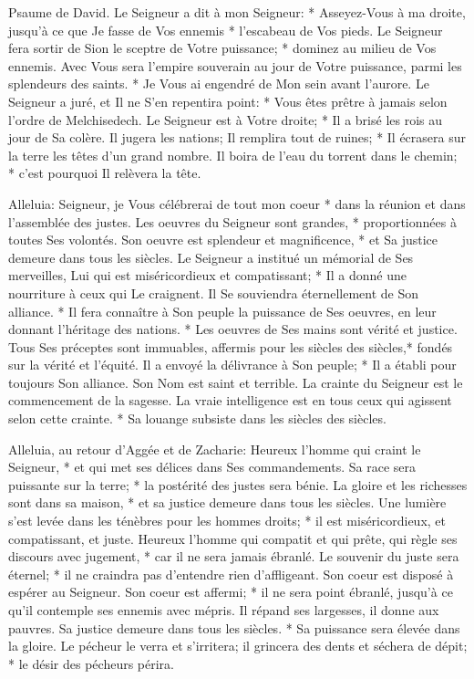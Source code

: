 Psaume de David. Le Seigneur a dit à mon Seigneur: * Asseyez-Vous à ma droite, jusqu'à ce que Je fasse de Vos ennemis * l'escabeau de Vos pieds.
Le Seigneur fera sortir de Sion le sceptre de Votre puissance; * dominez au milieu de Vos ennemis.
Avec Vous sera l'empire souverain au jour de Votre puissance, parmi les splendeurs des saints. * Je Vous ai engendré de Mon sein avant l'aurore.
Le Seigneur a juré, et Il ne S'en repentira point: * Vous êtes prêtre à jamais selon l'ordre de Melchisedech.
Le Seigneur est à Votre droite; * Il a brisé les rois au jour de Sa colère.
Il jugera les nations; Il remplira tout de ruines; * Il écrasera sur la terre les têtes d'un grand nombre.
Il boira de l'eau du torrent dans le chemin; * c'est pourquoi Il relèvera la tête.

Alleluia: Seigneur, je Vous célébrerai de tout mon coeur * dans la réunion et dans l'assemblée des justes.
Les oeuvres du Seigneur sont grandes, * proportionnées à toutes Ses volontés.
Son oeuvre est splendeur et magnificence, * et Sa justice demeure dans tous les siècles.
Le Seigneur a institué un mémorial de Ses merveilles, Lui qui est miséricordieux et compatissant; *
Il a donné une nourriture à ceux qui Le craignent. Il Se souviendra éternellement de Son alliance. *
Il fera connaître à Son peuple la puissance de Ses oeuvres,
en leur donnant l'héritage des nations. * Les oeuvres de Ses mains sont vérité et justice.
Tous Ses préceptes sont immuables, affermis pour les siècles des siècles,* fondés sur la vérité et l'équité.
Il a envoyé la délivrance à Son peuple; * Il a établi pour toujours Son alliance. Son Nom est saint et terrible.
La crainte du Seigneur est le commencement de la sagesse. La vraie intelligence est en tous ceux qui agissent selon cette crainte. * Sa louange subsiste dans les siècles des siècles.

Alleluia, au retour d'Aggée et de Zacharie: Heureux l'homme qui craint le Seigneur, * et qui met ses délices dans Ses commandements.
Sa race sera puissante sur la terre; * la postérité des justes sera bénie.
La gloire et les richesses sont dans sa maison, * et sa justice demeure dans tous les siècles.
Une lumière s'est levée dans les ténèbres pour les hommes droits; * il est miséricordieux, et compatissant, et juste.
Heureux l'homme qui compatit et qui prête, qui règle ses discours avec jugement, *
car il ne sera jamais ébranlé.
Le souvenir du juste sera éternel; * il ne craindra pas d'entendre rien d'affligeant. Son coeur est disposé à espérer au Seigneur.
Son coeur est affermi; * il ne sera point ébranlé, jusqu'à ce qu'il contemple ses ennemis avec mépris.
Il répand ses largesses, il donne aux pauvres. Sa justice demeure dans tous les siècles. * Sa puissance sera élevée dans la gloire.
Le pécheur le verra et s'irritera; il grincera des dents et séchera de dépit; * le désir des pécheurs périra.

